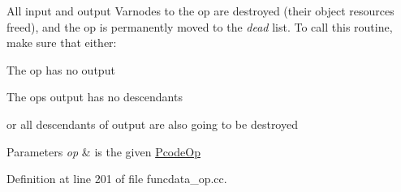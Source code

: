 All input and output Varnodes to the op are destroyed (their object resources freed), and the op is permanently moved to the {\itshape dead} list. To call this routine, make sure that either\+:
\begin{DoxyItemize}
\item The op has no output
\item The op\textquotesingle{}s output has no descendants
\item or all descendants of output are also going to be destroyed
\end{DoxyItemize}


\begin{DoxyParams}{Parameters}
{\em op} & is the given \mbox{\hyperlink{class_pcode_op}{Pcode\+Op}} \\
\hline
\end{DoxyParams}


Definition at line 201 of file funcdata\+\_\+op.\+cc.

